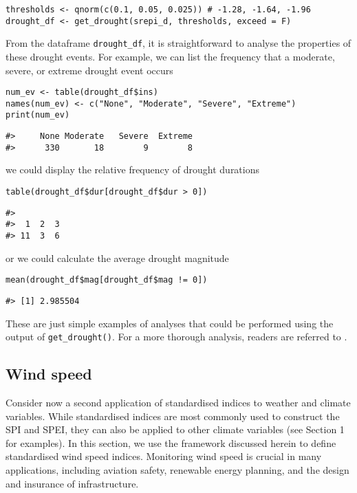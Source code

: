 \begin{verbatim}
thresholds <- qnorm(c(0.1, 0.05, 0.025)) # -1.28, -1.64, -1.96
drought_df <- get_drought(srepi_d, thresholds, exceed = F)
\end{verbatim}

From the dataframe \texttt{drought\_df}, it is straightforward to analyse the properties of these drought events. For example, we can list the frequency that a moderate, severe, or extreme drought event occurs

\begin{verbatim}
num_ev <- table(drought_df$ins)
names(num_ev) <- c("None", "Moderate", "Severe", "Extreme")
print(num_ev)
\end{verbatim}

\begin{verbatim}
#>     None Moderate   Severe  Extreme 
#>      330       18        9        8
\end{verbatim}

we could display the relative frequency of drought durations

\begin{verbatim}
table(drought_df$dur[drought_df$dur > 0])
\end{verbatim}

\begin{verbatim}
#> 
#>  1  2  3 
#> 11  3  6
\end{verbatim}

or we could calculate the average drought magnitude

\begin{verbatim}
mean(drought_df$mag[drought_df$mag != 0])
\end{verbatim}

\begin{verbatim}
#> [1] 2.985504
\end{verbatim}

These are just simple examples of analyses that could be performed using the output of \texttt{get\_drought()}. For a more thorough analysis, readers are referred to \cite{AllenOtero2023}.

\subsection{Wind speed}\label{wind-speed}

Consider now a second application of standardised indices to weather and climate variables. While standardised indices are most commonly used to construct the SPI and SPEI, they can also be applied to other climate variables (see Section 1 for examples). In this section, we use the framework discussed herein to define standardised wind speed indices. Monitoring wind speed is crucial in many applications, including aviation safety, renewable energy planning, and the design and insurance of infrastructure.

